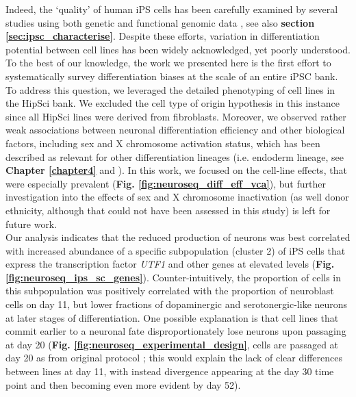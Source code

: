 Indeed, the `quality' of human iPS cells has been carefully examined by several studies using both genetic and functional genomic data \cite{muller2011bioinformatic, international2018assessment, tsankov2015qpcr, bock2011reference}, see also \textbf{section \ref{sec:ipsc_characterise}}. 
Despite these efforts, variation in differentiation potential between cell lines has been widely acknowledged, yet poorly understood. 
To the best of our knowledge, the work we presented here is the first effort to systematically survey differentiation biases at the scale of an entire iPSC bank. 
To address this question, we leveraged the detailed phenotyping of cell lines in the HipSci bank.
We excluded the cell type of origin hypothesis \cite{hu2016effects} in this instance since all HipSci lines were derived from fibroblasts.
Moreover, we observed rather weak associations between neuronal differentiation efficiency and other biological factors, including sex and X chromosome activation status, which has been described as relevant for other differentiation lineages (i.e. endoderm lineage, see \textbf{Chapter \ref{chapter4}} and \cite{cuomo2020single}).
In this work, we focused on the cell-line effects, that were especially prevalent (\textbf{Fig. \ref{fig:neuroseq_diff_eff_vca}}), but further investigation into the effects of sex and X chromosome inactivation (as well donor ethnicity, although that could not have been assessed in this study) is left for future work. \\

Our analysis indicates that the reduced production of neurons was best correlated with increased abundance of a specific subpopulation (cluster 2) of iPS cells that express the transcription factor \textit{UTF1} and other genes at elevated levels (\textbf{Fig. \ref{fig:neuroseq_ips_sc_genes}}).
Counter-intuitively, the proportion of cells in this subpopulation was positively correlated with the proportion of neuroblast cells on day 11, but lower fractions of dopaminergic and serotonergic-like neurons at later stages of differentiation. 
One possible explanation is that cell lines that commit earlier to a neuronal fate disproportionately lose neurons upon passaging at day 20 (\textbf{Fig. \ref{fig:neuroseq_experimental_design}}, cells are passaged at day 20 as from original protocol \cite{kriks2011dopamine}; this would explain the lack of clear differences between lines at day 11, with instead divergence appearing at the day 30 time point and then becoming even more evident by day 52). \\

